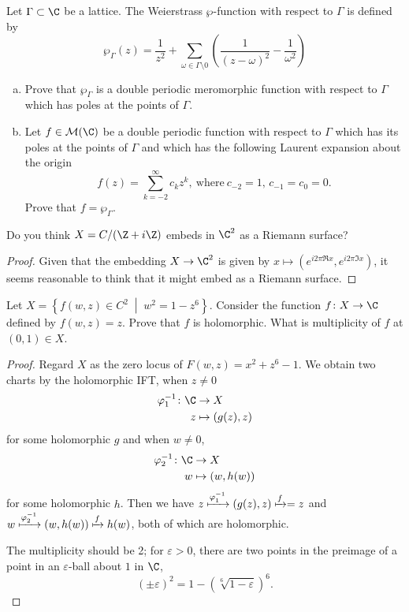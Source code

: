 \documentclass[10pt]{amsart}
\begin{document}
\begin{thm}
  Let $\Gamma \subset \C$ be a lattice.
  The Weierstrass $\wp$-function with respect to $\Gamma$ is defined by
  $$\wp_\Gamma (z) = \frac{1}{z^2} + \sum_{\omega \in \Gamma \setminus 0} \left( \frac{1}{(z - \omega)^2} - \frac{1}{\omega^2}\right)$$
  
  \begin{enumerate}[(a)]
  \item
    Prove that $\wp_\Gamma$ is a double periodic meromorphic function with respect to $\Gamma$ which has poles at the points of $\Gamma$.
  \item
    Let $f \in \mathcal{M}(\C)$ be a double periodic function with respect to $\Gamma$ which has its poles at the points of $\Gamma$ and which has the following Laurent expansion about the origin
    $$f(z) = \sum_{k = -2}^\infty c_kz^k,\ \text{where}\ c_{-2} = 1,\, c_{-1} = c_0 = 0.$$
    Prove that $f = \wp_\Gamma$.
  \end{enumerate}
\end{thm}

\begin{thm}
  Do you think $X = C/(\Z + i\Z)$ embeds in $\C^2$ as a Riemann surface?

  \begin{proof}
    Given that the embedding $X \rightarrow \C^2$ is given by $x \mapsto (e^{i2\pi\Re{x}}, e^{i2\pi\Im{x}})$, it seems reasonable to think that it might embed as a Riemann surface.
  \end{proof}
\end{thm}

\begin{thm}
  Let $X = \left\{f(w, z) \in C^2 \;\middle\vert\; w^2 = 1 - z^6\right\}$.
  Consider the function $f \colon X \rightarrow \C$ defined by $f(w, z) = z$.
  Prove that $f$ is holomorphic. 
  What is multiplicity of $f$ at $(0, 1) \in X$.

  \begin{proof}
    Regard $X$ as the zero locus of $F(w,z) = x^2 + z^6 - 1$.
    We obtain two charts by the holomorphic IFT, when $z \neq 0$ 
    \begin{align*}
      \varphi_1^{-1} \colon \C &\rightarrow X\\
      z &\mapsto (g(z), z)
    \end{align*}
    for some holomorphic $g$ and when $w \neq 0$, 
    \begin{align*}
      \varphi_2^{-1} \colon \C &\rightarrow X\\
      w &\mapsto (w, h(w))
      \end{align*}
    for some holomorphic $h$.
    Then we have $z \xmapsto{\varphi_1^{-1}} (g(z), z) \xmapsto{f} = z$ and $w \xmapsto{\varphi_2^{-1}} (w, h(w)) \xmapsto{f} h(w)$, both of which are holomorphic.
    
    The multiplicity should be 2; for $\varepsilon > 0$, there are two points in the preimage of a point in an $\varepsilon$-ball about $1$ in $\C$,
    $$(\pm \varepsilon)^2 = 1 - (\sqrt[6]{1 - \varepsilon})^6.$$
  \end{proof}
\end{thm}
\end{document}
